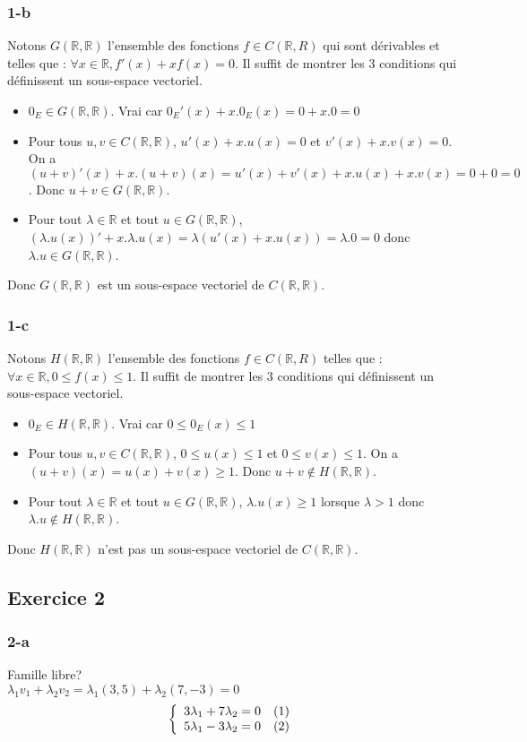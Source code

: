\documentclass[]{book}
\theoremstyle{definition}
\newcommand{\bb}[1]{\mathbb{#1}}
\newcommand{\R}{\bb{R}}
\begin{document}
\subsubsection*{1-b}
Notons $G(\R,\R)$ l'ensemble des fonctions $f \in C(\R,R)$ qui sont d\'erivables et telles que : $\forall x \in \R, f'(x)+xf(x) = 0$.
Il suffit de montrer les 3 conditions qui d\'efinissent un sous-espace vectoriel.
\begin{itemize}
\item $0_E \in G(\R,\R)$. Vrai car $0_E'(x) + x.0_E(x) = 0 + x.0 = 0$
\item Pour tous $u, v \in C(\R,\R)$, $u'(x) + x.u(x) = 0$ et $v'(x)+x.v(x) = 0$. On a $(u+v)'(x) + x.(u+v)(x) = u'(x) + v'(x) + x.u(x) + x.v(x) = 0 + 0 = 0$. Donc  $u+v \in G(\R,\R)$.
\item Pour tout $\lambda \in \R$ et tout $u \in G(\R,\R)$, $(\lambda.u(x))'+x.\lambda.u(x) = \lambda (u'(x) + x.u(x)) = \lambda.0 = 0$ donc $\lambda.u \in G(\R,\R)$.
\end{itemize}
Donc $G(\R,\R)$ est un sous-espace vectoriel de $C(\R,\R)$.

\subsubsection*{1-c}
Notons $H(\R,\R)$ l'ensemble des fonctions $f \in C(\R,R)$ telles que : $\forall x \in \R, 0 \leq f(x) \leq 1$.
Il suffit de montrer les 3 conditions qui d\'efinissent un sous-espace vectoriel.
\begin{itemize}
\item $0_E \in H(\R,\R)$. Vrai car $0 \leq 0_E(x) \leq 1$
\item Pour tous $u, v \in C(\R,\R)$, $0 \leq u(x) \leq 1$ et $0 \leq v(x) \leq 1$. On a $(u+v)(x) = u(x) + v(x) \geq 1$. Donc  $u+v \notin H(\R,\R)$.
\item Pour tout $\lambda \in \R$ et tout $u \in G(\R,\R)$, $\lambda.u(x) \geq 1$ lorsque $\lambda > 1$ donc $\lambda.u \notin H(\R,\R)$.
\end{itemize}
Donc $H(\R,\R)$ n'est pas un sous-espace vectoriel de $C(\R,\R)$.


\subsection*{Exercice 2}
\subsubsection*{2-a}
Famille libre? \\
$\lambda_1 v_1 + \lambda_2 v_2 = \lambda_1 (3,5) + \lambda_2 (7,-3) = 0$
$$
\left\{ 
\begin{array}{l l}
3 \lambda_1 + 7 \lambda_2 = 0 & (1)\\
5 \lambda_1 - 3 \lambda_2 = 0 & (2)\\
\end{array}
\right. 
$$ 
\end{document}
